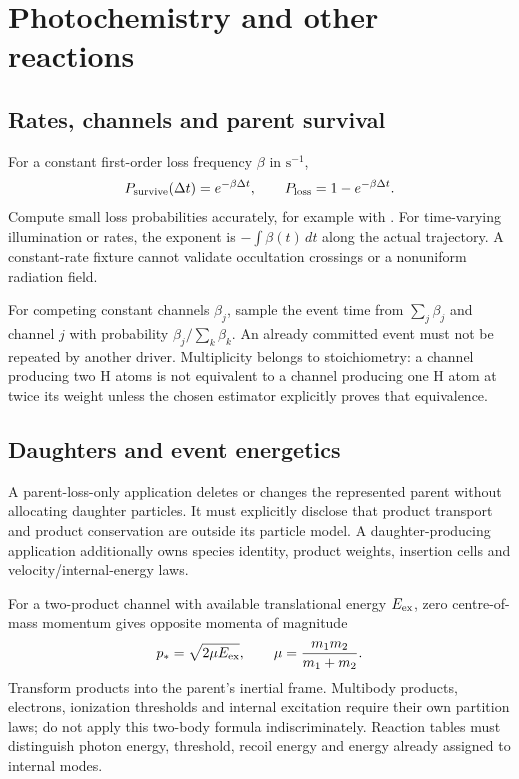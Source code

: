 \chapter{Photochemistry and other reactions}\label{ch:chemistry}
\section{Rates, channels and parent survival}
For a constant first-order loss frequency $\beta$ in $\mathrm{s^{-1}}$,
\begin{equation}
P_{\rm survive}(\Delta t)=e^{-\beta\Delta t},\qquad
P_{\rm loss}=1-e^{-\beta\Delta t}.
\end{equation}
Compute small loss probabilities accurately, for example with
. For time-varying illumination or rates, the exponent
is $-\int\beta(t)\,dt$ along the actual trajectory. A constant-rate fixture
cannot validate occultation crossings or a nonuniform radiation field.

For competing constant channels $\beta_j$, sample the event time from
$\sum_j\beta_j$ and channel $j$ with probability
$\beta_j/\sum_k\beta_k$. An already committed event must not be repeated
by another driver. Multiplicity belongs to stoichiometry: a channel producing
two H atoms is not equivalent to a channel producing one H atom at twice its
weight unless the chosen estimator explicitly proves that equivalence.

\section{Daughters and event energetics}
A parent-loss-only application deletes or changes the represented parent
without allocating daughter particles. It must explicitly disclose that
product transport and product conservation are outside its particle model.
A daughter-producing application additionally owns species identity, product
weights, insertion cells and velocity/internal-energy laws.

For a two-product channel with available translational energy $E_{\rm ex}$,
zero centre-of-mass momentum gives opposite momenta of magnitude
\begin{equation}
p_*=\sqrt{2\mu E_{\rm ex}},\qquad
\mu=\frac{m_1m_2}{m_1+m_2}.
\end{equation}
Transform products into the parent's inertial frame. Multibody products,
electrons, ionization thresholds and internal excitation require their own
partition laws; do not apply this two-body formula indiscriminately.
Reaction tables must distinguish photon energy, threshold, recoil energy
and energy already assigned to internal modes.

